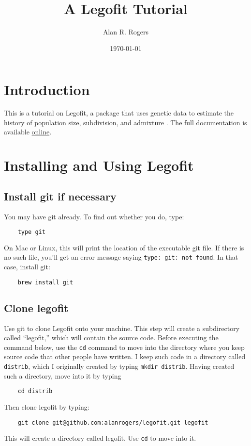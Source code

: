 \documentclass[11pt]{article}
\begin{document}
\title{A Legofit Tutorial}
\author{Alan R. Rogers}
\date{\today}
\maketitle

\section{Introduction}
This is a tutorial on Legofit, a package that uses genetic data to
estimate the history of population size, subdivision, and admixture
\citep{Rogers:BMC-20-526, Rogers:PCJ-2-e32}. The full documentation is
available
\href{http://alanrogers.github.io/legofit/html/index.html}{online}.

\section{Installing and Using Legofit}

\subsection{Install git if necessary}

You may have git already. To find out whether you do, type:
\begin{verbatim}
    type git
\end{verbatim}
On Mac or Linux, this will print the location of the executable git
file. If there is no such file, you'll get an error message saying
\texttt{type: git: not found}. In that case, install git:
\begin{verbatim}
    brew install git
\end{verbatim}

\subsection{Clone legofit}
Use git to clone Legofit onto your machine. This step will create a
subdirectory called ``legofit,'' which will contain the source
code. Before executing the command below, use the \texttt{cd} command
to move into the directory where you keep source code that other
people have written. I keep such code in a directory called
\texttt{distrib}, which I originally created by typing \texttt{mkdir
  distrib}. Having created such a directory, move into it by typing
\begin{verbatim}
    cd distrib
\end{verbatim}
Then clone legofit by typing:
\begin{verbatim}
    git clone git@github.com:alanrogers/legofit.git legofit
\end{verbatim}
This will create a directory called legofit. Use \texttt{cd} to move into it.
\end{document}
